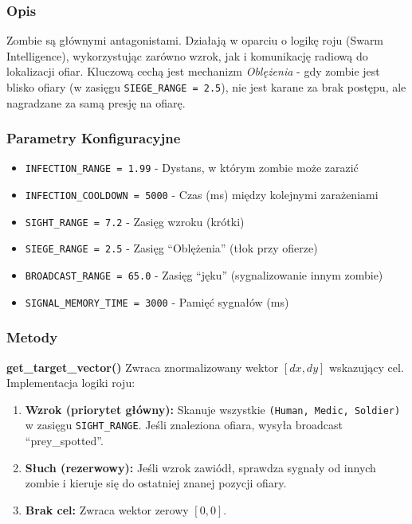 \documentclass[12pt,a4paper]{article}
\begin{document}
\subsubsection{Opis}
Zombie są głównymi antagonistami. Działają w oparciu o logikę roju (Swarm
Intelligence), wykorzystując zarówno wzrok, jak i komunikację radiową do
lokalizacji ofiar. Kluczową cechą jest mechanizm \textit{Oblężenia} - gdy
zombie jest blisko ofiary (w zasięgu \texttt{SIEGE\_RANGE = 2.5}), nie jest
karane za brak postępu, ale nagradzane za samą presję na ofiarę.

\subsubsection{Parametry Konfiguracyjne}
\begin{itemize}
	\item \texttt{INFECTION\_RANGE = 1.99} - Dystans, w którym zombie może zarazić
	\item \texttt{INFECTION\_COOLDOWN = 5000} - Czas (ms) między kolejnymi zarażeniami
	\item \texttt{SIGHT\_RANGE = 7.2} - Zasięg wzroku (krótki)
	\item \texttt{SIEGE\_RANGE = 2.5} - Zasięg ``Oblężenia'' (tłok przy ofierze)
	\item \texttt{BROADCAST\_RANGE = 65.0} - Zasięg ``jęku'' (sygnalizowanie innym zombie)
	\item \texttt{SIGNAL\_MEMORY\_TIME = 3000} - Pamięć sygnałów (ms)
\end{itemize}

\subsubsection{Metody}

\textbf{get\_target\_vector()}
Zwraca znormalizowany wektor $[dx, dy]$ wskazujący cel. Implementacja logiki roju:

\begin{enumerate}
	\item \textbf{Wzrok (priorytet główny):} Skanuje wszystkie \texttt{(Human, Medic, Soldier)} w zasięgu \texttt{SIGHT\_RANGE}. Jeśli znaleziona ofiara, wysyła broadcast ``prey\_spotted''.
	\item \textbf{Słuch (rezerwowy):} Jeśli wzrok zawiódł, sprawdza sygnały od innych zombie i kieruje się do ostatniej znanej pozycji ofiary.
	\item \textbf{Brak cel:} Zwraca wektor zerowy $[0, 0]$.
\end{enumerate}
\end{document}
